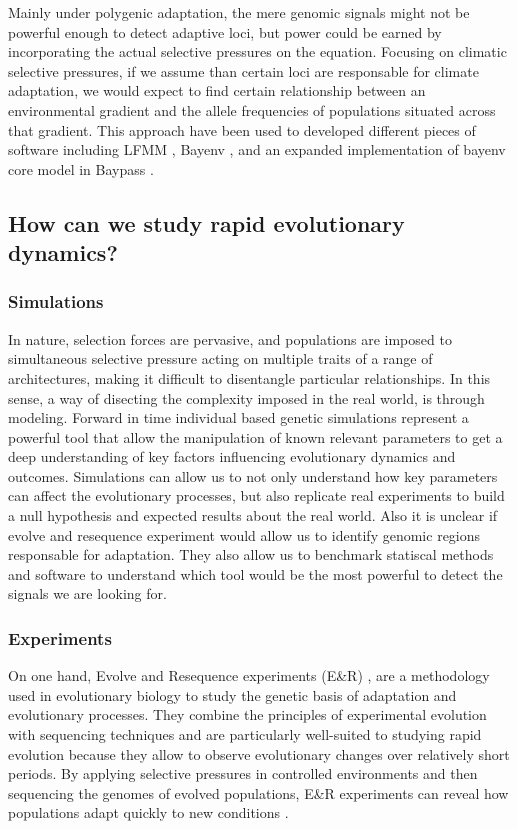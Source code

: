 \documentclass{article}
\begin{document}
Mainly under polygenic adaptation, the mere genomic signals might not be powerful enough to detect adaptive loci, but power could be earned by incorporating the actual selective pressures on the equation. Focusing on climatic selective pressures, if we assume than certain loci are responsable for climate adaptation, we would expect to find certain relationship between an environmental gradient and the allele frequencies of populations situated across that gradient. This approach have been used to developed different pieces of software including LFMM \citep{Frichot2013-mg}, Bayenv \citep{Gunther2013-fw}, and an expanded implementation of bayenv core model in Baypass \citep{Gautier2015-lp}.

\subsection{How can we study rapid evolutionary dynamics? }
\subsubsection{Simulations}
In nature, selection forces are pervasive, and populations are imposed to simultaneous selective pressure acting on multiple traits of a range of architectures, making it difficult to disentangle particular relationships. In this sense,  a way of disecting the complexity imposed in the real world, is through modeling. Forward in time individual based genetic simulations represent a powerful tool that allow the manipulation of known relevant parameters to get a deep understanding of key factors influencing evolutionary dynamics and outcomes. Simulations can allow us to not only understand how key parameters can affect the evolutionary processes, but also replicate real experiments to build a null hypothesis and expected results about the real world. Also it is unclear if evolve and resequence experiment would allow us to identify genomic regions responsable for adaptation. 
They also allow us to benchmark statiscal methods and software to understand which tool would be the most powerful to detect the signals we are looking for. 

\subsubsection{Experiments}
On one hand, Evolve and Resequence experiments (E\&R) \citep{Schlotterer2015-yz}, are a methodology used in evolutionary biology to study the genetic basis of adaptation and evolutionary processes. They combine the principles of experimental evolution with sequencing techniques and are particularly well-suited to studying rapid evolution because they allow to observe evolutionary changes over relatively short periods. By applying selective pressures in controlled environments and then sequencing the genomes of evolved populations, E\&R experiments can reveal how populations adapt quickly to new conditions \citep{Bergland2014-ud, Kapun2021-cd, Rudman2022-uc}.
\end{document}
